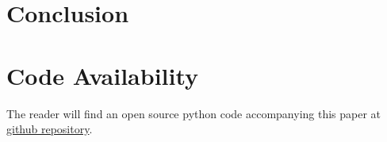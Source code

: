 \documentclass[reprint, amsmath, amssymb, aps]{revtex4-2}
\begin{document}
\section{Conclusion}

\begin{acknowledgments}

\end{acknowledgments}

\section*{Code Availability}

The reader will find an open source python code accompanying this paper at \href{https://github.com/MatthieuSarkis/qdo}{github repository}.

\appendix

\nocite{*}


\end{document}
